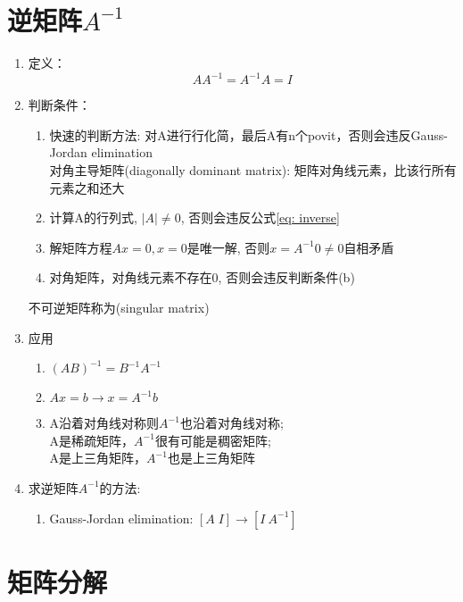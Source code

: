 \documentclass{book}
\begin{document}
\section{逆矩阵$A^{-1}$}
\begin{enumerate}
  \item 定义：
    \begin{equation}
      AA^{-1}=A^{-1}A=I
      \label{eq: inverse}
    \end{equation}
  \item 判断条件：
    \begin{enumerate}
      \item 快速的判断方法: 对A进行行化简，最后A有n个povit，否则会违反Gauss-Jordan elimination\\ 
        对角主导矩阵(diagonally dominant matrix): 矩阵对角线元素，比该行所有元素之和还大
      \item 计算A的行列式, $\vert A\vert\neq 0$, 否则会违反公式\ref{eq: inverse}
      \item 解矩阵方程$Ax=0, x=0$是唯一解, 否则$x=A^{-1}0\neq 0$自相矛盾
      \item 对角矩阵，对角线元素不存在0, 否则会违反判断条件(b)
    \end{enumerate}
    不可逆矩阵称为(singular matrix)
  \item 应用
    \begin{enumerate}
      \item $(AB)^{-1}=B^{-1}A^{-1}$ 
      \item $Ax=b\rightarrow x=A^{-1}b$
      \item A沿着对角线对称则$A^{-1}$也沿着对角线对称;\\ 
            A是稀疏矩阵，$A^{-1}$很有可能是稠密矩阵;\\ 
            A是上三角矩阵，$A^{-1}$也是上三角矩阵
    \end{enumerate}
  \item 求逆矩阵$A^{-1}$的方法:
    \begin{enumerate}
      \item Gauss-Jordan elimination: $\left[A \; I\right]\rightarrow [I \: A^{-1}]$
    \end{enumerate}
\end{enumerate}
\section{矩阵分解}
\end{document}
